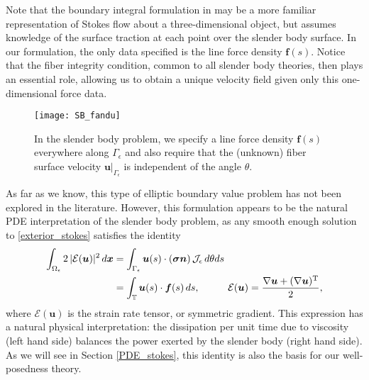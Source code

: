 \documentclass[11pt]{article}
\numberwithin{equation}{section}
\newcommand{\T}{\mathbb{T}}
\newcommand{\E}{\mathcal{E}}
\newcommand{\bu}{\bm{u}}
\newcommand{\bx}{\bm{x}}
\newcommand{\ts}{\thinspace}
\theoremstyle{definition}
\begin{document}
Note that the boundary integral formulation in \cite{koens2018boundary} may be a more familiar representation of Stokes flow about a three-dimensional object, but assumes knowledge of the surface traction at each point over the slender body surface. In our formulation, the only data specified is the line force density $\bm{f}(s)$. Notice that the fiber integrity condition, common to all  slender body theories, then plays an essential role, allowing us to obtain a unique velocity field given only this one-dimensional force data. \\

\begin{figure}[!h]
\centering
\texttt{[image: SB\_fandu]}
\caption{In the slender body problem, we specify a line force density $\bm{f}(s)$ everywhere along $\Gamma_\epsilon$ and also require that the (unknown) fiber surface velocity $\bu\big|_{\Gamma_\epsilon}$ is independent of the angle $\theta$.}
\label{fig:fandu}
\end{figure}

As far as we know, this type of elliptic boundary value problem has not been explored in the literature. However, this formulation appears to be the natural PDE interpretation of the slender body problem, as any smooth enough solution to \eqref{exterior_stokes} satisfies the identity
\begin{align*}
\int_{\Omega_{\epsilon}} 2 \ts |\E(\bu)|^2\ts d\bx &= \int_{\Gamma_{\epsilon}} \bu(s)\cdot(\bm{\sigma}{\bm n}) \ts \mathcal{J}_{\epsilon} \ts d\theta ds \\
&= \int_{\T} \bu(s)\cdot {\bm f}(s)\ts ds, \hspace{1cm} \E(\bu) = \frac{\nabla\bu+(\nabla\bu)^{\rm T}}{2},
 \end{align*}
 where $\E(\bu)$ is the strain rate tensor, or symmetric gradient. This expression has a natural physical interpretation: the dissipation per unit time due to viscosity (left hand side) balances the power exerted by the slender body (right hand side). As we will see in Section \ref{PDE_stokes}, this identity is also the basis for our well-posedness theory.  \\
 
\end{document}
